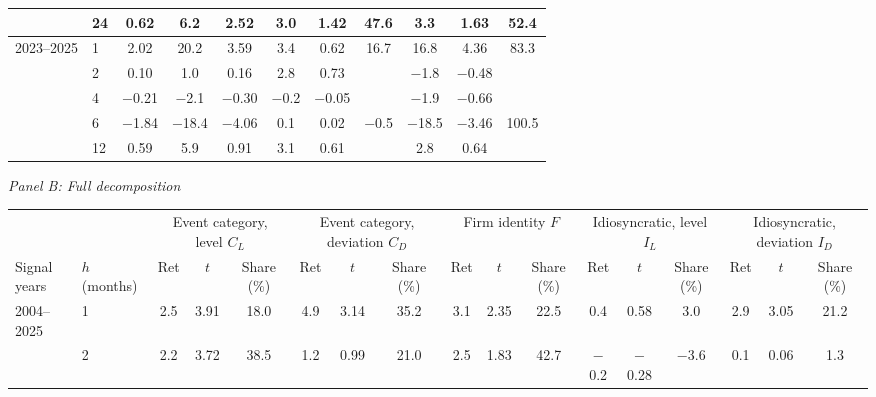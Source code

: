 \begin{table}[htbp]
{\begin{adjustbox}{max width=\linewidth, max totalheight=0.28\textheight}
\begin{tabular}{llccccccccc}
 & 24 & \phantom{$-$}0.62 & \phantom{$-$0}6.2 & \phantom{$-$}2.52 & \phantom{$-$}3.0 & \phantom{$-$}1.42 & \phantom{$-$}47.6 & \phantom{$-$0}3.3 & \phantom{$-$}1.63 & \phantom{0}52.4 \\
\midrule
2023--2025 & 1 & \phantom{$-$}2.02 & \phantom{$-$}20.2 & \phantom{$-$}3.59 & \phantom{$-$}3.4 & \phantom{$-$}0.62 & \phantom{$-$}16.7 & \phantom{$-$}16.8 & \phantom{$-$}4.36 & \phantom{0}83.3 \\
 & 2 & \phantom{$-$}0.10 & \phantom{$-$0}1.0 & \phantom{$-$}0.16 & \phantom{$-$}2.8 & \phantom{$-$}0.73 &  & \phantom{0}$-$1.8 & $-$0.48 &  \\
 & 4 & $-$0.21 & \phantom{0}$-$2.1 & $-$0.30 & $-$0.2 & $-$0.05 &  & \phantom{0}$-$1.9 & $-$0.66 &  \\
 & 6 & $-$1.84 & $-$18.4 & $-$4.06 & \phantom{$-$}0.1 & \phantom{$-$}0.02 & \phantom{0}$-$0.5 & $-$18.5 & $-$3.46 & 100.5 \\
 & 12 & \phantom{$-$}0.59 & \phantom{$-$0}5.9 & \phantom{$-$}0.91 & \phantom{$-$}3.1 & \phantom{$-$}0.61 &  & \phantom{$-$0}2.8 & \phantom{$-$}0.64 &  \\
\bottomrule
\end{tabular}
\end{adjustbox}
\par\medskip
\textit{Panel B: Full decomposition}\\[2pt]
\begin{adjustbox}{max width=\linewidth, max totalheight=0.28\textheight}
\begin{tabular}{llccccccccccccccc}
\toprule
\multicolumn{2}{c}{} & \multicolumn{3}{c}{Event category, level $C_L$} & \multicolumn{3}{c}{Event category, deviation $C_D$} & \multicolumn{3}{c}{Firm identity $F$} & \multicolumn{3}{c}{Idiosyncratic, level $I_L$} & \multicolumn{3}{c}{Idiosyncratic, deviation $I_D$} \\
\cmidrule(lr){3-5} \cmidrule(lr){6-8} \cmidrule(lr){9-11} \cmidrule(lr){12-14} \cmidrule(lr){15-17}
Signal years & $h$ (months) & Ret & $t$ & Share (\%) & Ret & $t$ & Share (\%) & Ret & $t$ & Share (\%) & Ret & $t$ & Share (\%) & Ret & $t$ & Share (\%) \\
\midrule
2004--2025 & 1 & 2.5 & 3.91 & \phantom{$-$}18.0 & \phantom{$-$0}4.9 & \phantom{$-$}3.14 & 35.2 & \phantom{$-$}3.1 & \phantom{$-$}2.35 & \phantom{$-$}22.5 & \phantom{$-$}0.4 & \phantom{$-$}0.58 & \phantom{$-$0}3.0 & \phantom{$-$}2.9 & \phantom{$-$}3.05 & 21.2 \\
 & 2 & 2.2 & 3.72 & \phantom{$-$}38.5 & \phantom{$-$0}1.2 & \phantom{$-$}0.99 & 21.0 & \phantom{$-$}2.5 & \phantom{$-$}1.83 & \phantom{$-$}42.7 & $-$0.2 & $-$0.28 & \phantom{0}$-$3.6 & \phantom{$-$}0.1 & \phantom{$-$}0.06 & \phantom{0}1.3 \\

\end{tabular}
\end{adjustbox}}
\end{table}
